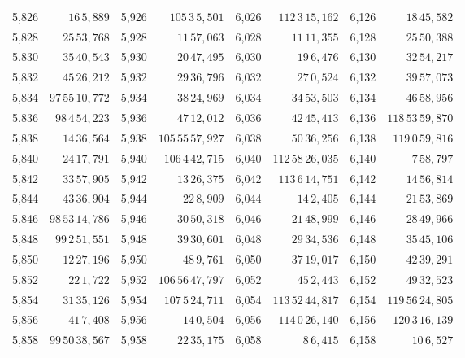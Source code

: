 \begin{tabular}{|r|r||r|r||r|r||r|r|}
5,826 & \(16\,5,\!889\) & 5,926 & \(105\,3\,5,\!501\) & 6,026 & \(112\,3\,15,\!162\) & 6,126 & \(18\,45,\!582\) \\
5,828 & \(25\,53,\!768\) & 5,928 & \(11\,57,\!063\) & 6,028 & \(11\,11,\!355\) & 6,128 & \(25\,50,\!388\) \\
5,830 & \(35\,40,\!543\) & 5,930 & \(20\,47,\!495\) & 6,030 & \(19\,6,\!476\) & 6,130 & \(32\,54,\!217\) \\[1pt]
5,832 & \(45\,26,\!212\) & 5,932 & \(29\,36,\!796\) & 6,032 & \(27\,0,\!524\) & 6,132 & \(39\,57,\!073\) \\
5,834 & \(97\,55\,10,\!772\) & 5,934 & \(38\,24,\!969\) & 6,034 & \(34\,53,\!503\) & 6,134 & \(46\,58,\!956\) \\
5,836 & \(98\,4\,54,\!223\) & 5,936 & \(47\,12,\!012\) & 6,036 & \(42\,45,\!413\) & 6,136 & \(118\,53\,59,\!870\) \\
5,838 & \(14\,36,\!564\) & 5,938 & \(105\,55\,57,\!927\) & 6,038 & \(50\,36,\!256\) & 6,138 & \(119\,0\,59,\!816\) \\
5,840 & \(24\,17,\!791\) & 5,940 & \(106\,4\,42,\!715\) & 6,040 & \(112\,58\,26,\!035\) & 6,140 & \(7\,58,\!797\) \\[1pt]
5,842 & \(33\,57,\!905\) & 5,942 & \(13\,26,\!375\) & 6,042 & \(113\,6\,14,\!751\) & 6,142 & \(14\,56,\!814\) \\
5,844 & \(43\,36,\!904\) & 5,944 & \(22\,8,\!909\) & 6,044 & \(14\,2,\!405\) & 6,144 & \(21\,53,\!869\) \\
5,846 & \(98\,53\,14,\!786\) & 5,946 & \(30\,50,\!318\) & 6,046 & \(21\,48,\!999\) & 6,146 & \(28\,49,\!966\) \\
5,848 & \(99\,2\,51,\!551\) & 5,948 & \(39\,30,\!601\) & 6,048 & \(29\,34,\!536\) & 6,148 & \(35\,45,\!106\) \\
5,850 & \(12\,27,\!196\) & 5,950 & \(48\,9,\!761\) & 6,050 & \(37\,19,\!017\) & 6,150 & \(42\,39,\!291\) \\[1pt]
5,852 & \(22\,1,\!722\) & 5,952 & \(106\,56\,47,\!797\) & 6,052 & \(45\,2,\!443\) & 6,152 & \(49\,32,\!523\) \\
5,854 & \(31\,35,\!126\) & 5,954 & \(107\,5\,24,\!711\) & 6,054 & \(113\,52\,44,\!817\) & 6,154 & \(119\,56\,24,\!805\) \\
5,856 & \(41\,7,\!408\) & 5,956 & \(14\,0,\!504\) & 6,056 & \(114\,0\,26,\!140\) & 6,156 & \(120\,3\,16,\!139\) \\
5,858 & \(99\,50\,38,\!567\) & 5,958 & \(22\,35,\!175\) & 6,058 & \(8\,6,\!415\) & 6,158 & \(10\,6,\!527\) \\

\end{tabular}
